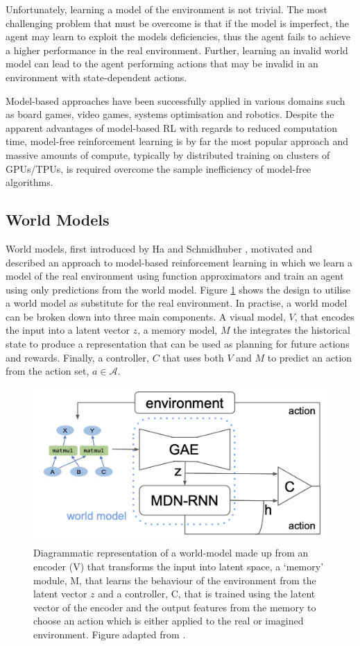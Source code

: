Unfortunately, learning a model of the environment is not trivial. The most challenging problem that must be overcome is that if the model is imperfect, the agent may learn to exploit the models deficiencies, thus the agent fails to achieve a higher performance in the real environment. Further, learning an invalid world model can lead to the agent performing actions that may be invalid in an environment with state-dependent actions.

Model-based approaches have been successfully applied in various domains such as board games, video games, systems optimisation and robotics. Despite the apparent advantages of model-based RL with regards to reduced computation time, model-free reinforcement learning is by far the most popular approach and massive amounts of compute, typically by distributed training on clusters of GPUs/TPUs, is required overcome the sample inefficiency of model-free algorithms.

\subsection{World Models}
World models, first introduced by Ha and Schmidhuber \cite{ha2018worldmodels}, motivated and described an approach to model-based reinforcement learning in which we learn a model of the real environment using function approximators and train an agent using only predictions from the world model. Figure \ref{fig:bg:mb-rl} shows the design to utilise a world model as substitute for the real environment. In practise, a world model can be broken down into three main components. A visual model, $V$, that encodes the input into a latent vector $z$, a memory model, $M$ the integrates the historical state to produce a representation that can be used as planning for future actions and rewards. Finally, a controller, $C$ that uses both $V$ and $M$ to predict an action from the action set, $a \in \mathcal{A}$.

\begin{figure}[ht]
  \centering
  \includegraphics[width=0.75\columnwidth]{sections/2background/images/mb-rl}
  \caption[Model-based Reinforcement Learning End-To-End System]{Diagrammatic representation of a world-model made up from an encoder (V) that transforms the input into latent space, a `memory' module, M, that learns the behaviour of the environment from the latent vector $z$ and a controller, C, that is trained using the latent vector of the encoder and the output features from the memory to choose an action which is either applied to the real or imagined environment. Figure adapted from \cite{ha2018worldmodels}.}
  \label{fig:bg:mb-rl}
\end{figure}

